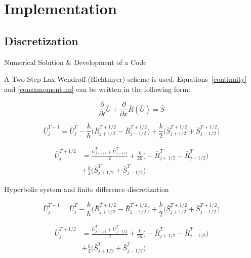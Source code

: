 \documentclass{beamer}
\newcommand{\partder}[2]{\frac{\partial #1}{\partial #2}}
\newcommand{\tensor}[1]{\bar{#1}}
\newcommand{\tensplus}[3]{\tensor{#1}_{#2}^{#3}}
\begin{document}
\section{Implementation}
\subsection{Discretization}

\begin{frame}{Numerical Solution $\&$ Development of a Code}
\footnotesize
		\begin{block}{}
		A Two-Step Lax-Wendroff (Richtmyer) scheme is used. Equations~\ref{continuity} and \ref{consxmomentum} can be written in the following form:

		\begin{equation} 
			\label{discrete1}
			\partder{}{t} \tensor{U} + \partder{}{x} \tensor{R}(\tensor{U}) = \tensor{S}
		\end{equation}
		\end{block}
		
			\begin{equation*}
		\label{bigu1}
		\tensplus{U}{j}{T+1} = \tensplus{U}{j}{T} - \frac{k}{h} \Bigg(\tensplus{R}{j+1/2}{T+1/2} - \tensplus{R}{j-1/2}{T+1/2} \Bigg) + \frac{k}{2} \Bigg(\tensplus{S}{j		+1/2}{T+1/2} + \tensplus{S}{j-1/2}{T+1/2} \Bigg)
	\end{equation*}
	
		\begin{align*}
		\tensplus{U}{j}{T+1/2} &= \frac{\tensplus{U}{j+1/2}{T} + \tensplus{U}{j-1/2}{T}}{2} + \frac{k}{2h} \Bigg(-\tensplus{R}{j+1/2}{T} - \tensplus{R}{j-1/2}{T} \Bigg)\\ 		&+ \frac{k}{4} \Bigg(\tensplus{S}{j+1/2}{T} + \tensplus{S}{j-1/2}{T} \Bigg)
		\end{align*}
\end{frame}


\begin{frame}{Hyperbolic system and finite difference discretization}
\footnotesize

	\begin{equation*}
		\label{bigu1}
		\tensplus{U}{j}{T+1} = \tensplus{U}{j}{T} - \frac{k}{h} \Bigg(\tensplus{R}{j+1/2}{T+1/2} - \tensplus{R}{j-1/2}{T+1/2} \Bigg) + \frac{k}{2} \Bigg(\tensplus{S}{j		+1/2}{T+1/2} + \tensplus{S}{j-1/2}{T+1/2} \Bigg)
	\end{equation*}
	
		\begin{align*}
		\tensplus{U}{j}{T+1/2} &= \frac{\tensplus{U}{j+1/2}{T} + \tensplus{U}{j-1/2}{T}}{2} + \frac{k}{2h} \Bigg(-\tensplus{R}{j+1/2}{T} - \tensplus{R}{j-1/2}{T} \Bigg)\\ 		&+ \frac{k}{4} \Bigg(\tensplus{S}{j+1/2}{T} + \tensplus{S}{j-1/2}{T} \Bigg)
		\end{align*}

\end{frame}
\end{document}

